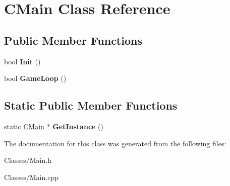 \hypertarget{class_c_main}{}\section{C\+Main Class Reference}
\label{class_c_main}
\subsection*{Public Member Functions}
\begin{DoxyCompactItemize}
\item 
bool {\bfseries Init} ()\hypertarget{class_c_main_a4670e6ec18a9d37e7c4eaa434fd05960}{}\label{class_c_main_a4670e6ec18a9d37e7c4eaa434fd05960}

\item 
bool {\bfseries Game\+Loop} ()\hypertarget{class_c_main_a78bb32c2155fb61d5f7c137b3134cdfb}{}\label{class_c_main_a78bb32c2155fb61d5f7c137b3134cdfb}

\end{DoxyCompactItemize}
\subsection*{Static Public Member Functions}
\begin{DoxyCompactItemize}
\item 
static \hyperlink{class_c_main}{C\+Main} $\ast$ {\bfseries Get\+Instance} ()\hypertarget{class_c_main_a75cc0f5be6ff981a22b094fedb091804}{}\label{class_c_main_a75cc0f5be6ff981a22b094fedb091804}

\end{DoxyCompactItemize}


The documentation for this class was generated from the following files\+:\begin{DoxyCompactItemize}
\item 
Classes/Main.\+h\item 
Classes/Main.\+cpp\end{DoxyCompactItemize}
